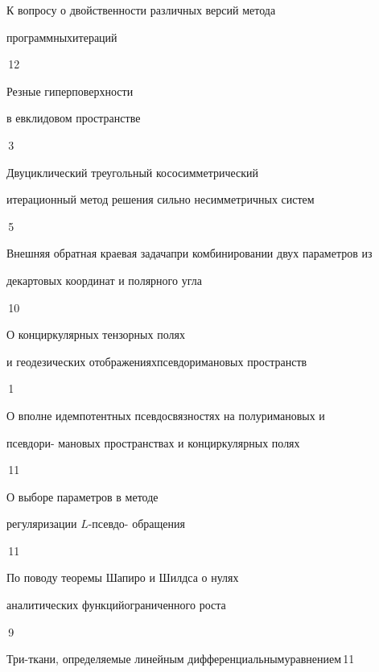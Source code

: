 

{К вопросу о двойственности различных версий метода


программных\newline итераций}{\No\,12}




{Резные гиперповерхности


в евклидовом пространстве}{\No\,3}




{Двуциклический треугольный кососимметрический \newline


итерационный метод решения сильно несимметричных систем}{\No\,5}




{Внешняя обратная краевая задача\newline при комбинировании двух параметров из


декартовых координат и полярного угла}{\No\,10}




{О конциркулярных тензорных полях


и геодезических отображениях\newline псевдоримановых пространств}{\No\,1}




{О вполне идемпотентных псевдосвязностях на полуримановых и


псевдори- \newline мановых пространствах и конциркулярных полях}{\No\,11}




{О выборе параметров в методе


регуляризации $L$-псевдо- \newline обращения}{\No\,11}




{По поводу теоремы Шапиро и Шилдса о нулях  


аналитических функций\newline ограниченного роста}{\No\,9}




{Три-ткани, определяемые линейным дифференциальным\newline уравнением}{\No\,11}




